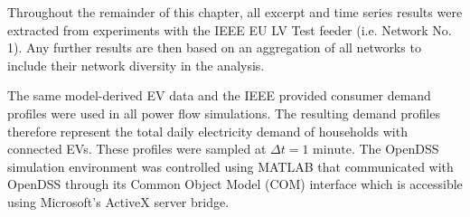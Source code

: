 

Throughout the remainder of this chapter, all excerpt and time series results were extracted from experiments with the IEEE EU LV Test feeder (i.e. Network No. 1).
Any further results are then based on an aggregation of all networks to include their network diversity in the analysis.

The same model-derived EV data and the IEEE provided consumer demand profiles were used in all power flow simulations.
The resulting demand profiles therefore represent the total daily electricity demand of households with connected EVs.
These profiles were sampled at $\Delta t = 1\text{ minute}$.
The OpenDSS simulation environment was controlled using MATLAB that communicated with OpenDSS through its Common Object Model (COM) interface which is accessible using Microsoft's ActiveX server bridge.

